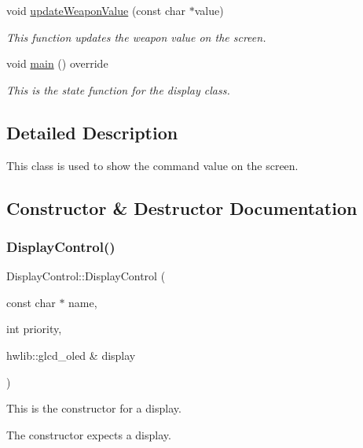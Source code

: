\begin{DoxyCompactItemize}
void \mbox{\hyperlink{class_display_control_ae343066ad92148ddc6cd9f253993d4b4}{update\+Weapon\+Value}} (const char $\ast$value)
\begin{DoxyCompactList}\small\item\em This function updates the weapon value on the screen. \end{DoxyCompactList}\item 
void \mbox{\hyperlink{class_display_control_a9707c32249e0a648afc2def818900f30}{main}} () override
\begin{DoxyCompactList}\small\item\em This is the state function for the display class. \end{DoxyCompactList}\end{DoxyCompactItemize}


\subsection{Detailed Description}
This class is used to show the command value on the screen. 

\subsection{Constructor \& Destructor Documentation}
\mbox{\label{class_display_control_a5a24ccc28d6984bda6871ef6d0e4af3f}} 
\subsubsection{\texorpdfstring{Display\+Control()}{DisplayControl()}}
{\footnotesize\ttfamily Display\+Control\+::\+Display\+Control (\begin{DoxyParamCaption}\item[{const char $\ast$}]{name,  }\item[{int}]{priority,  }\item[{hwlib\+::glcd\+\_\+oled \&}]{display }\end{DoxyParamCaption})\hspace{0.3cm}{\ttfamily [inline]}}



This is the constructor for a display. 

The constructor expects a display. 

